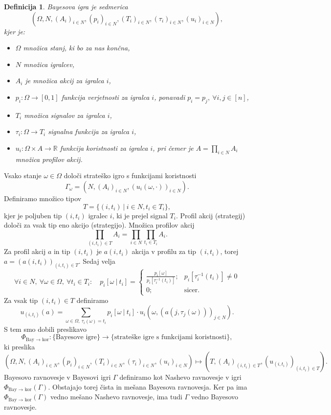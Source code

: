 \documentclass[10pt, a4paper]{article}
\newtheorem{defi}[izr]{Definicija}
\newenvironment{noticeB}{%
  \tcolorbox[%
  notitle,
  empty,
  enhanced,  %
  breakable,
  coltext=black,
  colback=white, 
  fontupper=\rmfamily,
  parbox=false,
  noparskip,
  sharp corners,
  boxrule=-1pt,  %
  frame hidden,
  left=7pt,  %
  right=7pt,
  top=5pt,
  bottom=5pt,
  before skip=2.5ex plus 2pt,
  after skip=2.5ex plus 2pt,
  borderline west = {1.5pt}{-0.1pt}{blue!30!black}, %
  overlay unbroken and last={%
    \draw[color=black, line width=1.25pt]
    ($(frame.south west)+(1.pt, -0.1pt)$) -- ++(2em, 0);
  }
  ]}
{\endtcolorbox}
\newenvironment{definicija}{\begin{defi}\begin{noticeB}}{%
    \end{noticeB}\end{defi}}
\newcommand{\R}{\mathbb {R}}
\begin{document}
\begin{definicija}
  Bayesova igra je sedmerica 
  $$(\Omega, N, (A_i)_{i \in N}, (p_i)_{i \in N}, (T_i)_{i \in N}, (\tau_i)_{i \in N}, (u_i)_{i \in N}),$$
  kjer je:
  \begin{itemize}
    \item $\Omega$ množica stanj, ki bo za nas končna,
    \item $N$ množica igralcev,
    \item $A_i$ je množica akcij za igralca $i$,
    \item $p_i: \Omega \to [0, 1]$ funkcija verjetnosti za igralca $i$, ponavadi $p_i = p_j,\ \forall i, j \in [n]$,
    \item $T_i$ množica signalov za igralca $i$,
    \item $\tau_i: \Omega \to T_i$ signalna funkcija za igralca $i$,
    \item $u_i: \Omega \times A \to \R$ funkcija koristnosti za igralca $i$, pri čemer je $A = \prod_{i \in N} A_i$ množica profilov akcij.
  \end{itemize}
\end{definicija}

Vsako stanje $\omega \in \Omega$ določi strateško igro s funkcijami koristnosti 
$$\Gamma_\omega = (N, (A_i)_{i \in N}, (u_i(\omega, \cdot))_{i \in N}).$$
Definiramo množico tipov 
$$T = \{(i, t_i)\ \big|\ i \in N, t_i \in T_i\},$$
kjer je poljuben tip $(i, t_i)$ igralec $i$, ki je prejel signal $T_i$.
Profil akcij (strategij) določi za vsak tip eno akcijo (strategijo).
Množica profilov akcij  
$$\prod_{(i, t_i) \in T} A_i = \prod_{i \in N} \prod_{t_i \in T_i} A_i.$$
Za profil akcij $a$ in tip $(i, t_i)$ je $a(i, t_i)$ akcija v profilu za tip $(i, t_i)$,
torej $a = (a(i, t_i))_{(i, t_i) \in T}$. Sedaj velja 
$$\forall i \in N,\ \forall \omega \in \Omega,\ \forall t_i \in T_i:\quad p_i [\omega\ |\ t_i] = \begin{cases}
  \frac{p_i[\omega]}{p_i[\tau_i ^{-1} (t_i)]};& p_i[\tau_i ^{-1} (t_i)] \neq 0\\
  0;&\mathrm{sicer}.
\end{cases}$$
Za vsak tip $(i, t_i) \in T$ definiramo  
$$u_{(i, t_i)} (a) = \sum_{\omega \in \Omega,\ \tau_i(\omega) = t_i} p_i [\omega\ |\ t_i] \cdot u_i(\omega, (a(j, \tau_j(\omega)))_{j \in N}).$$
S tem smo dobili preslikavo 
$$\Phi_{\text{Bay $\to$ kor}}: \{\text{Bayesove igre}\} \to \{\text{strateške igre s funkcijami koristnosti}\},$$
ki preslika 
$$(\Omega, N, (A_i)_{i \in N}, (p_i)_{i \in N}, (T_i)_{i \in N}, (\tau_i)_{i \in N}, (u_i)_{i \in N}) \mapsto (T, (A_i)_{(i, t_i) \in T}, (u_{(i, t_i)})_{(i, t_i) \in T}).$$
Bayesovo ravnovesje v Bayesovi igri $\Gamma$ definiramo kot Nashevo ravnovesje v igri $\Phi_{\text{Bay $\to$ kor}}(\Gamma)$.
Obstajajo torej čista in mešana Bayesova ravnovesja. Ker pa ima $\Phi_{\text{Bay $\to$ kor}}(\Gamma)$ vedno mešano Nashevo ravnovesje, 
ima tudi $\Gamma$ vedno Bayesovo ravnovesje.
\end{document}
